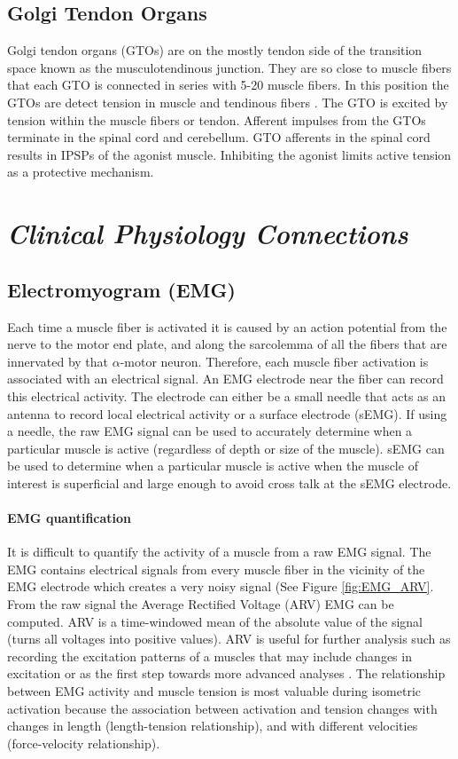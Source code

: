 \subsection{Golgi Tendon Organs}

Golgi tendon organs (GTOs) are on the mostly tendon side of the transition space known as the musculotendinous junction. They are so close to muscle fibers that each GTO is connected in series with 5-20 muscle fibers. In this position the GTOs are detect tension in muscle and tendinous fibers \cite{macefield_physiological_2005}. The GTO is excited by tension within the muscle fibers or tendon. Afferent impulses from the GTOs terminate in the spinal cord and cerebellum. GTO afferents in the spinal cord results in IPSPs of the agonist muscle. Inhibiting the agonist limits active tension as a protective mechanism.

\section{\textit{Clinical Physiology Connections}}

\subsection{Electromyogram (EMG)}

Each time a muscle fiber is activated it is caused by an action potential from the nerve to the motor end plate, and along the sarcolemma of all the fibers that are innervated by that $\alpha$-motor neuron. Therefore, each muscle fiber activation is associated with an electrical signal. An EMG electrode near the fiber can record this electrical activity. The electrode can either be a small needle that acts as an antenna to record local electrical activity or a surface electrode (sEMG). If using a needle, the raw EMG signal can be used to accurately determine when a particular muscle is active (regardless of depth or size of the muscle). sEMG can be used to determine when a particular muscle is active when the muscle of interest is superficial and large enough to avoid cross talk at the sEMG electrode. 

\paragraph{EMG quantification} It is difficult to quantify the activity of a muscle from a raw EMG signal. The EMG contains electrical signals from every muscle fiber in the vicinity of the EMG electrode which creates a very noisy signal (See Figure \ref{fig:EMG_ARV}. From the raw signal the Average Rectified Voltage (ARV) EMG can be computed. ARV is a time-windowed mean of the absolute value of the signal (turns all voltages into positive values). ARV is useful for further analysis such as recording the excitation patterns of a muscles that may include changes in excitation or as the first step towards more advanced analyses \cite{merletti_surface_2016}. The relationship between EMG activity and muscle tension is most valuable during isometric activation because the association between activation and tension changes with changes in length (length-tension relationship), and with different velocities (force-velocity relationship).

